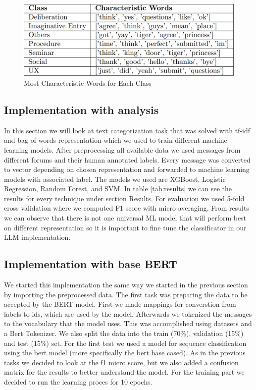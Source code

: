 \documentclass[fleqn,moreauthors,10pt]{ds_report}
\begin{document}
\begin{figure}[ht]\centering
	\includegraphics[width=\linewidth]{report/fig/tabela_besed.png}
        \caption{Most Characteristic Words for Each Class}
        \label{fig:words_class}
\end{figure}




\subsection*{Implementation with analysis}

In this section we will look at text categorization task that was solved with tf-idf and bag-of-words representation which we used to train different machine learning models. After preprocessing all available data we used messages from different forums and their human annotated labels. Every message was converted to vector depending on chosen representation and forwarded to machine learning models with associated label. The models we used are XGBoost, Logistic Regression, Random Forest, and SVM. In table \ref{tab:results} we can see the results for every technique under section Results. For evaluation we used 5-fold cross validation where we computed F1 score with micro averaging. From results we can observe that there is not one universal ML model that will perform best on different representation so it is important to fine tune the classificator in our LLM implementation.


\subsection*{Implementation with base BERT}

We started this implementation the same way we started in the previous section by importing the preprocessed data. The first task was preparing the data to be accepted by the BERT model. First we made mappings for converstion from labels to ids, which are used by the model. Afterwards we tokenized the messages to the vocabulary that the model uses. This was accomplished using datasets and a Bert Tokenizer. We also split the data into the train (70\%), validation (15\%) and test (15\%) set. For the first test we used a model for sequence classification using the bert model (more specifically the bert base cased). As in the previous tasks we decided to look at the f1 micro score, but we also added a confusion matrix for the results to better understand the model. For the training part we decided to run the learning proces for 10 epochs. \cite{bert} \cite{bertHF}
\end{document}
